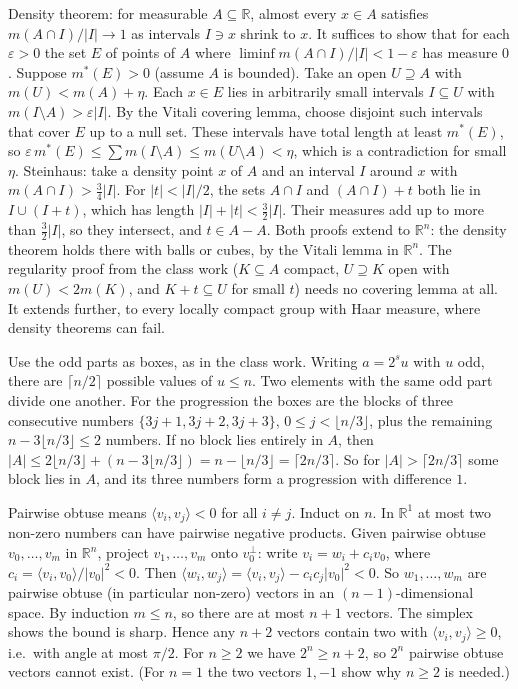 \documentclass[11pt,a4paper]{article}
\begin{document}
 Density theorem: for measurable $A\subseteq\mathbb R$, almost every $x\in A$ satisfies $m(A\cap I)/|I|\to1$ as intervals $I\ni x$ shrink to $x$. It suffices to show that for each $\varepsilon>0$ the set $E$ of points of $A$ where $\liminf m(A\cap I)/|I|<1-\varepsilon$ has measure $0$.
 Suppose $m^*(E)>0$ (assume $A$ is bounded). Take an open $U\supseteq A$ with $m(U)<m(A)+\eta$. Each $x\in E$ lies in arbitrarily small intervals $I\subseteq U$ with $m(I\setminus A)>\varepsilon|I|$. By the Vitali covering lemma, choose disjoint such intervals that cover $E$ up to a null set. These intervals have total length at least $m^*(E)$, so $\varepsilon\, m^*(E)\le\sum m(I\setminus A)\le m(U\setminus A)<\eta$, which is a contradiction for small $\eta$.
 Steinhaus: take a density point $x$ of $A$ and an interval $I$ around $x$ with $m(A\cap I)>\tfrac34|I|$. For $|t|<|I|/2$, the sets $A\cap I$ and $(A\cap I)+t$ both lie in $I\cup(I+t)$, which has length $|I|+|t|<\tfrac32|I|$. Their measures add up to more than $\tfrac32|I|$, so they intersect, and $t\in A-A$.
 Both proofs extend to $\mathbb R^n$: the density theorem holds there with balls or cubes, by the Vitali lemma in $\mathbb R^n$. The regularity proof from the class work ($K\subseteq A$ compact, $U\supseteq K$ open with $m(U)<2m(K)$, and $K+t\subseteq U$ for small $t$) needs no covering lemma at all. It extends further, to every locally compact group with Haar measure, where density theorems can fail.

 Use the odd parts as boxes, as in the class work. Writing $a=2^s u$ with $u$ odd, there are $\lceil n/2\rceil$ possible values of $u\le n$. Two elements with the same odd part divide one another.
 For the progression the boxes are the blocks of three consecutive numbers $\{3j+1,3j+2,3j+3\}$, $0\le j<\lfloor n/3\rfloor$, plus the remaining $n-3\lfloor n/3\rfloor\le2$ numbers. If no block lies entirely in $A$, then $|A|\le2\lfloor n/3\rfloor+(n-3\lfloor n/3\rfloor)=n-\lfloor n/3\rfloor=\lceil 2n/3\rceil$. So for $|A|>\lceil2n/3\rceil$ some block lies in $A$, and its three numbers form a progression with difference $1$.

 Pairwise obtuse means $\langle v_i,v_j\rangle<0$ for all $i\neq j$. Induct on $n$. In $\mathbb R^1$ at most two non-zero numbers can have pairwise negative products.
 Given pairwise obtuse $v_0,\dots,v_m$ in $\mathbb R^n$, project $v_1,\dots,v_m$ onto $v_0^\perp$: write $v_i=w_i+c_iv_0$, where $c_i=\langle v_i,v_0\rangle/|v_0|^2<0$.
 Then $\langle w_i,w_j\rangle=\langle v_i,v_j\rangle-c_ic_j|v_0|^2<0$. So $w_1,\dots,w_m$ are pairwise obtuse (in particular non-zero) vectors in an $(n-1)$-dimensional space. By induction $m\le n$, so there are at most $n+1$ vectors. The simplex shows the bound is sharp.
 Hence any $n+2$ vectors contain two with $\langle v_i,v_j\rangle\ge0$, i.e.\ with angle at most $\pi/2$. For $n\ge2$ we have $2^n\ge n+2$, so $2^n$ pairwise obtuse vectors cannot exist. (For $n=1$ the two vectors $1,-1$ show why $n\ge2$ is needed.)
\end{document}
